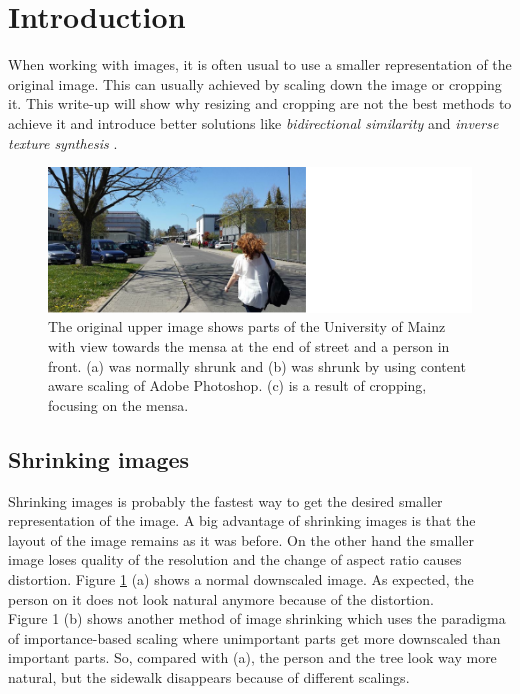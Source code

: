 \section{Introduction}
When working with images, it is often usual to use a smaller representation of the original image.
This can usually achieved by scaling down the image or cropping it. This write-up will show why resizing and cropping are not the best methods to achieve it and introduce better solutions like \textit{bidirectional similarity} \cite{bisi} and \textit{inverse texture synthesis} \cite{its}. 

\begin{figure}[h]
\centering
\includegraphics[scale=0.9]{img/ShrinkingCropping}
\caption[Image shrinking]{The original upper image shows parts of the University of Mainz with view towards
the mensa at the end of street and a person in front. (a) was normally shrunk and (b) was shrunk by using content aware scaling of Adobe Photoshop\footnotemark. (c) is a result of cropping, focusing on the mensa.}
\label{fig:Image shrinking}
\end{figure}


\subsection{Shrinking images}
Shrinking images is probably the fastest way to get the desired smaller representation of the image. A big advantage of shrinking images is that the layout of the image remains as it was before. On the other hand the smaller image loses quality of the resolution and the change of aspect ratio causes distortion. Figure \ref{fig:Image shrinking} (a) shows a normal downscaled image. As expected, the person on it does not look natural anymore because of the distortion.\\
Figure 1 (b) shows another method of image shrinking which uses the paradigma of importance-based scaling where unimportant parts get more downscaled than important parts. So, compared with (a), the person and the tree look way more natural, but the sidewalk disappears because of different scalings.



